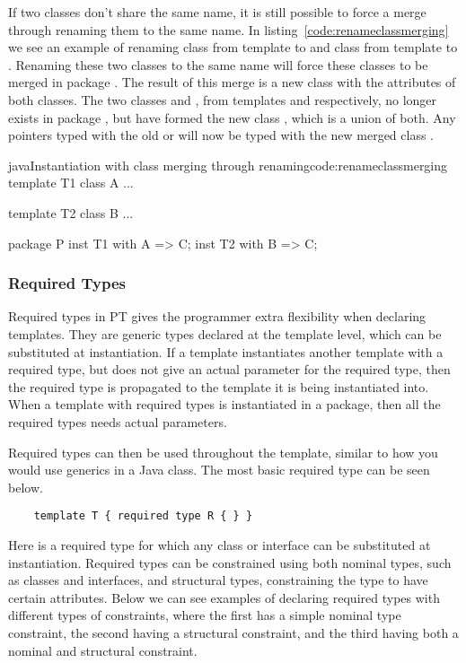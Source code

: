 If two classes don't share the same name, it is still possible to force a merge through renaming them to the same name.
In listing~\vref{code:renameclassmerging} we see an example of renaming class  from template  to  and class  from template  to .
Renaming these two classes to the same name will force these classes to be merged in package .
The result of this merge is a new class  with the attributes of both classes.
The two classes  and , from templates  and  respectively, no longer exists in package , but have formed the new class , which is a union of both.
Any pointers typed with the old  or  will now be typed with the new merged class .

\begin{code}{java}{Instantiation with class merging through renaming}{code:renameclassmerging}
template T1 {
    class A {
        ...
    }
}

template T2 {
    class B {
        ...
    }
}

package P {
    inst T1 with A => C;
    inst T2 with B => C;
}
\end{code}

\subsubsection{Required Types}\label{subsubsec:required-types}

Required types in PT gives the programmer extra flexibility when declaring templates.
They are generic types declared at the template level, which can be substituted at instantiation.
If a template instantiates another template with a required type, but does not give an actual parameter for the required type, then the required type is propagated to the template it is being instantiated into.
When a template with required types is instantiated in a package, then all the required types needs actual parameters.

Required types can then be used throughout the template, similar to how you would use generics in a Java class.
The most basic required type can be seen below.

\begin{verbatim}
    template T { required type R { } }
\end{verbatim}

Here  is a required type for which any class or interface can be substituted at instantiation.
Required types can be constrained using both nominal types, such as classes and interfaces, and structural types, constraining the type to have certain attributes.
Below we can see examples of declaring required types with different types of constraints, where the first has a simple nominal type constraint, the second having a structural constraint, and the third having both a nominal and structural constraint.

